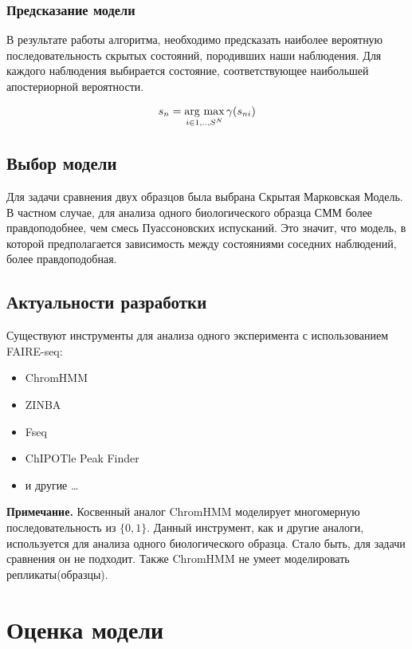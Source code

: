 \documentclass{matmex-diploma-custom}
\begin{document}
\subsubsection{Предсказание модели}
В результате работы алгоритма, необходимо предсказать наиболее вероятную последовательность скрытых состояний, породивших наши наблюдения.
Для каждого наблюдения выбирается состояние, соответствующее наибольшей апостериорной вероятности\cite{wiki:voron}.

$$s_n = \mathop{\rm arg~max}\limits_{i \in {1,..,S}^N} {\gamma (s_{ni})} $$

\subsection{Выбор модели}
Для задачи сравнения двух образцов была выбрана Скрытая Марковская Модель.
В частном случае, для анализа одного биологического образца СММ более правдоподобнее, чем смесь Пуассоновских испусканий.
Это значит, что модель, в которой предполагается зависимость между состояниями соседних наблюдений, более правдоподобная.

\subsection{Актуальности разработки}

Существуют инструменты для анализа одного эксперимента с использованием FAIRE-seq:

\begin{itemize}
  \item ChromHMM
  \item ZINBA
  \item Fseq
  \item ChIPOTle Peak Finder 
  \item и другие \ldots
\end{itemize}

\textbf{Примечание.} Косвенный аналог ChromHMM моделирует многомерную последовательность из $\{0, 1\}$. Данный инструмент, как и другие аналоги, используется для анализа одного биологического образца. Стало быть, для задачи сравнения он не подходит. Также ChromHMM не умеет моделировать репликаты(образцы).

\section{Оценка модели}
\end{document}
